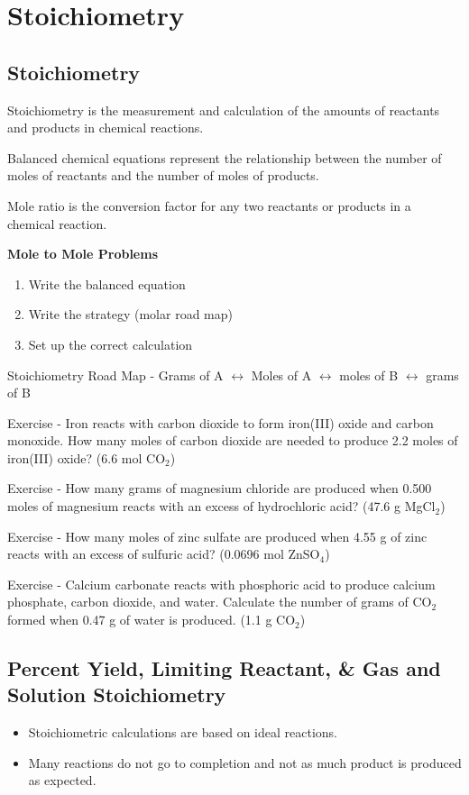 \documentclass[../hchem.tex]{subfiles}
\begin{document}
\chapter{Stoichiometry}
\section{Stoichiometry}
Stoichiometry is the measurement and calculation of the amounts of reactants and products in chemical reactions.

Balanced chemical equations represent the relationship between the number of moles of reactants and the number of moles of products.

Mole ratio is the conversion factor for any two reactants or products in a chemical reaction.

\textbf{Mole to Mole Problems}
\begin{enumerate}
    \item Write the balanced equation 
    \item Write the strategy (molar road map)
    \item Set up the correct calculation
\end{enumerate}

Stoichiometry Road Map - Grams of A $\leftrightarrow$ Moles of A $\leftrightarrow$ moles of B $\leftrightarrow$ grams of B 

Exercise - Iron reacts with carbon dioxide to form iron(III) oxide and carbon monoxide. How many moles of carbon dioxide are needed to produce 2.2 moles of iron(III) oxide? (6.6 mol CO$_2$)

Exercise - How many grams of magnesium chloride are produced when 0.500 moles of magnesium reacts with an excess of hydrochloric acid? (47.6 g MgCl$_2$)

Exercise - How many moles of zinc sulfate are produced when 4.55 g of zinc reacts with an excess of sulfuric acid? (0.0696 mol ZnSO$_4$)

Exercise - Calcium carbonate reacts with phosphoric acid to produce calcium phosphate, carbon dioxide, and water. 
Calculate the number of grams of CO$_2$ formed when 0.47 g of water is produced. (1.1 g CO$_2$)

\section{Percent Yield, Limiting Reactant, \& Gas and Solution Stoichiometry}
\begin{itemize}
    \item Stoichiometric calculations are based on ideal reactions.
    \item Many reactions do not go to completion and not as much product is produced as expected.
\end{itemize}
\end{document}
